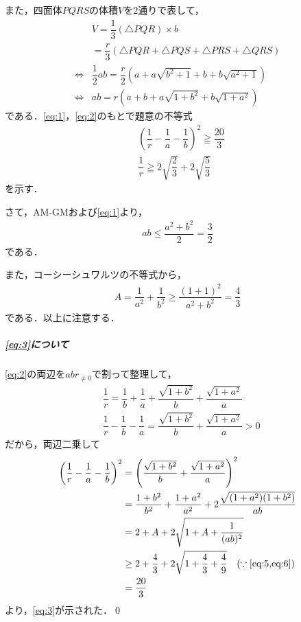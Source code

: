\documentclass[../../main.tex]{subfiles}
\begin{document}
また，四面体$PQRS$の体積$V$を$2$通りで表して，
\begin{align}
  &V=\dfrac{1}{3}(\triangle PQR)×b \nonumber\\
  &=\dfrac{r}{3}(\triangle PQR+\triangle PQS+\triangle PRS+\triangle QRS) \nonumber\\
  \Longleftrightarrow
  &\dfrac{1}{2}ab=\dfrac{r}{2}(a+a\sqrt{b^2+1}+b+b\sqrt{a^2+1})\nonumber \\
  \Longleftrightarrow
  &ab=r(a+b+a\sqrt{1+b^2}+b\sqrt{1+a^2})\label{eq:2}
\end{align}
である．\cref{eq:1}，\cref{eq:2}のもとで題意の不等式
\begin{align}
  & { \left( \dfrac{1}{r}-\dfrac{1}{a}-\dfrac{1}{b} \right) }^2 \geqq \dfrac{20}{3} \label{eq:3}\\
  & \dfrac{1}{r} \geqq 2\sqrt{\dfrac{2}{3}}+2\sqrt{\dfrac{5}{3}} \label{eq:4}
\end{align}
を示す．

さて，AM-GMおよび\cref{eq:1}より，
\begin{align}
  ab\le\dfrac{a^2+b^2}{2}=\dfrac{3}{2} \label{eq:5}
\end{align}
である．

また，コーシーシュワルツの不等式から，
\begin{align}
  A=\dfrac{1}{a^2}+\dfrac{1}{b^2}\ge\dfrac{(1+1)^2}{a^2+b^2}=\dfrac{4}{3} \label{eq:6}
\end{align}
である．以上に注意する．

\subparagraph{\cref{eq:3}について}

\cref{eq:2}の両辺を$abr_{\not=0}$で割って整理して，
\begin{align}
  &\dfrac{1}{r}=\dfrac{1}{b}+\dfrac{1}{a}+\dfrac{\sqrt{1+b^2}}{b}+\dfrac{\sqrt{1+a^2}}{a} \\
  &\dfrac{1}{r} - \dfrac{1}{b} - \dfrac{1}{a} = \dfrac{\sqrt{1+b^2}}{b}+\dfrac{\sqrt{1+a^2}}{a} > 0  \label{eq:7}
\end{align}
だから，両辺二乗して
\begin{align}
  \left(\dfrac{1}{r}-\dfrac{1}{a}-\dfrac{1}{b}\right)^2
  & =\left(\dfrac{\sqrt{1+b^2}}{b}+\dfrac{\sqrt{1+a^2}}{a}\right)^2 \\
  &=\dfrac{1+b^2}{b^2}+\dfrac{1+a^2}{a^2}+2\dfrac{\sqrt{(1+a^2)(1+b^2)}}{ab} \\
  &=2+A+2\sqrt{1+A+\dfrac{1}{(ab)^2}} \\
  &\ge 2+\dfrac{4}{3}+2\sqrt{1+\dfrac{4}{3}+\dfrac{4}{9}} \quad (\because \text{\cref{eq:5,eq:6}}) \\
  &=\dfrac{20}{3}
\end{align}
より，\cref{eq:3}が示された．\qed
\end{document}
